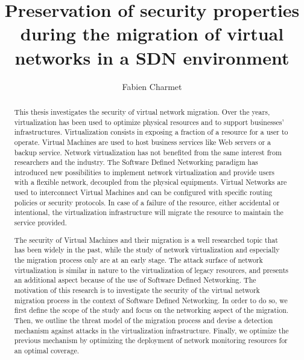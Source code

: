 \documentclass[a4paper, 11pt]{report}
\title{\LARGE \bf Preservation of security properties during the migration of virtual networks in a SDN environment}
\author{Fabien Charmet}
\theoremstyle{definition}
\begin{document}
% 

\maketitle
\begin{abstract}
This thesis investigates the security of virtual network migration. Over the years, virtualization has been used to optimize physical resources and to support businesses' infrastructures. Virtualization consists in exposing a fraction of a resource for a user to operate. Virtual Machines are used to host business services like Web servers or a backup service. Network virtualization has not benefited from the same interest from researchers and the industry. The Software Defined Networking paradigm has introduced new possibilities to implement network virtualization and provide users with a flexible network, decoupled from the physical equipments. Virtual Networks are used to interconnect Virtual Machines and can be configured with specific routing policies or security protocols. In case of a failure of the resource, either accidental or intentional, the virtualization infrastructure will migrate the resource to maintain the service provided.

The security of Virtual Machines and their migration is a well researched topic that has been widely in the past, while the study of network virtualization and especially the migration process only are at an early stage. The attack surface of network virtualization is similar in nature to the virtualization of legacy resources, and presents an additional aspect because of the use of Software Defined Networking.
The motivation of this research is to investigate the security of the virtual network migration process in the context of Software Defined Networking. In order to do so, we first define the scope of the study and focus on the networking aspect of the migration. Then, we outline the threat model of the migration process and devise a detection mechanism against attacks in the virtualization infrastructure. Finally, we optimize the previous mechanism by optimizing the deployment of network monitoring resources for an optimal coverage.


\end{abstract}
\end{document}
